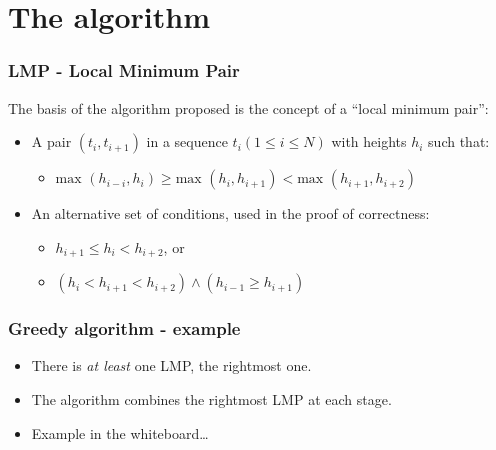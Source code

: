 \documentclass{beamer}
\begin{document}
    \section{The algorithm}
    \label{sec:algorithm}
        \begin{frame}
            \frametitle{LMP - Local Minimum Pair}
            The basis of the algorithm proposed is the concept of a ``local minimum
            pair'':

            \begin{itemize}
                \item A pair $(t_{i}, t_{i+1})$ in a sequence
                    $t_{i} (1 \leq i \leq N)$ with heights $h_{i}$ such that:
                    \begin{itemize}
                        \item $\text{max } (h_{i-i}, h_{i}) \geq
                            \text{max } (h_{i}, h_{i+1}) <
                            \text{max } (h_{i+1}, h_{i+2})$
                    \end{itemize}
                \item An alternative set of conditions, used in the proof
                    of correctness:
                    \begin{itemize}
                        \item $h_{i+1} \leq h_{i} < h_{i+2}$, or
                        \item $(h_{i} < h_{i+1} < h_{i+2}) \land
                            (h_{i-1} \geq h_{i+1})$
                    \end{itemize}
            \end{itemize}
        \end{frame}

        \begin{frame}
            \frametitle{Greedy algorithm - example}
            \begin{itemize}
                \item There is \emph{at least} one LMP, the rightmost one.
                \item The algorithm combines the rightmost LMP at each stage.
                \item Example in the whiteboard\ldots
            \end{itemize}
        \end{frame}
\end{document}
